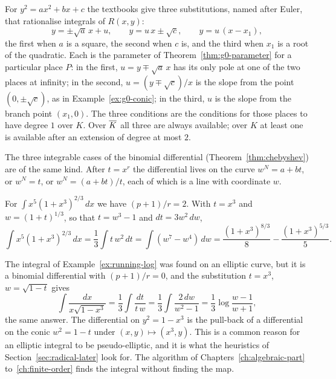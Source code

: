 For $y^2 = a x^2 + b x + c$ the textbooks give three substitutions, named
after Euler, that rationalise integrals of $R(x, y)$:
\[
  y = \pm\sqrt a\, x + u, \qquad
  y = u\, x \pm \sqrt c, \qquad
  y = u\,(x - x_1) ,
\]
the first when $a$ is a square, the second when $c$ is, and the third when
$x_1$ is a root of the quadratic. Each is the parameter of
Theorem~\ref{thm:g0-parameter} for a particular place $P$: in the first, $u =
y \mp \sqrt a\, x$ has its only pole at one of the two places at infinity; in
the second, $u = (y \mp \sqrt c)/x$ is the slope from the point $(0, \pm\sqrt
c)$, as in Example~\ref{ex:g0-conic}; in the third, $u$ is the slope from
the branch point $(x_1, 0)$. The three conditions are the conditions for
those places to have degree $1$ over $K$. Over $\overline{K}$ all three are always
available; over $K$ at least one is available after an extension of degree
at most $2$.

The three integrable cases of the binomial differential
(Theorem~\ref{thm:chebyshev}) are of the same kind. After $t = x^r$ the
differential lives on the curve $w^N = a + b t$, or $w^N = t$, or $w^N = (a
+ b t)/t$, each of which is a line with coordinate $w$.

\begin{example}\label{ex:g0-binomial}
For $\int x^5 (1 + x^3)^{2/3}\,dx$ we have $(p + 1)/r = 2$. With $t = x^3$
and $w = (1 + t)^{1/3}$, so that $t = w^3 - 1$ and $dt = 3w^2\,dw$,
\[
  \int x^5 (1 + x^3)^{2/3}\,dx = \frac13 \int t\, w^2\, dt
  = \int (w^7 - w^4)\, dw
  = \frac{(1 + x^3)^{8/3}}{8} - \frac{(1 + x^3)^{5/3}}{5} .
\]
\end{example}

\begin{example}\label{ex:g0-pseudo}
The integral of Example~\ref{ex:running-log} was found on an elliptic curve,
but it is a binomial differential with $(p + 1)/r = 0$, and the substitution
$t = x^3$, $w = \sqrt{1 - t}$ gives
\[
  \int \frac{dx}{x\sqrt{1 - x^3}} = \frac13 \int \frac{dt}{t\, w}
  = \frac13 \int \frac{2\,dw}{w^2 - 1}
  = \frac13 \log \frac{w - 1}{w + 1} ,
\]
the same answer. The differential on $y^2 = 1 - x^3$ is the pull-back of a
differential on the conic $w^2 = 1 - t$ under $(x, y) \mapsto (x^3, y)$. This
is a common reason for an elliptic integral to be pseudo-elliptic, and it
is what the heuristics of Section~\ref{sec:radical-later} look for. The
algorithm of Chapters~\ref{ch:algebraic-part}
to~\ref{ch:finite-order} finds the integral without finding the map.
\end{example}

